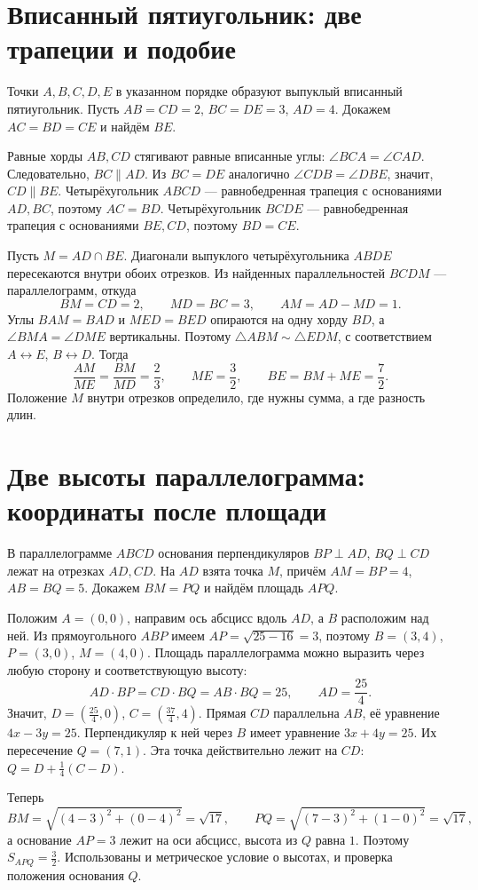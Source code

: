 \section{Вписанный пятиугольник: две трапеции и подобие}
\begin{example}\label{ex:review-ege-targeted-pentagon}
Точки \(A,B,C,D,E\) в указанном порядке образуют выпуклый вписанный пятиугольник. Пусть \(AB=CD=2\), \(BC=DE=3\), \(AD=4\). Докажем \(AC=BD=CE\) и найдём \(BE\).

Равные хорды \(AB,CD\) стягивают равные вписанные углы: \(\angle BCA=\angle CAD\). Следовательно, \(BC\parallel AD\). Из \(BC=DE\) аналогично \(\angle CDB=\angle DBE\), значит, \(CD\parallel BE\). Четырёхугольник \(ABCD\) --- равнобедренная трапеция с основаниями \(AD,BC\), поэтому \(AC=BD\). Четырёхугольник \(BCDE\) --- равнобедренная трапеция с основаниями \(BE,CD\), поэтому \(BD=CE\).

Пусть \(M=AD\cap BE\). Диагонали выпуклого четырёхугольника \(ABDE\) пересекаются внутри обоих отрезков. Из найденных параллельностей \(BCDM\) --- параллелограмм, откуда
\[
BM=CD=2,\qquad MD=BC=3,\qquad AM=AD-MD=1.
\]
Углы \(BAM=BAD\) и \(MED=BED\) опираются на одну хорду \(BD\), а \(\angle BMA=\angle DME\) вертикальны. Поэтому \(\triangle ABM\sim\triangle EDM\), с соответствием \(A\leftrightarrow E\), \(B\leftrightarrow D\). Тогда
\[
\frac{AM}{ME}=\frac{BM}{MD}=\frac23,
\qquad ME=\frac32,
\qquad BE=BM+ME=\frac72.
\]
Положение \(M\) внутри отрезков определило, где нужны сумма, а где разность длин.
\end{example}

\section{Две высоты параллелограмма: координаты после площади}
\begin{example}\label{ex:review-ege-targeted-parallelogram}
В параллелограмме \(ABCD\) основания перпендикуляров \(BP\perp AD\), \(BQ\perp CD\) лежат на отрезках \(AD,CD\). На \(AD\) взята точка \(M\), причём \(AM=BP=4\), \(AB=BQ=5\). Докажем \(BM=PQ\) и найдём площадь \(APQ\).

Положим \(A=(0,0)\), направим ось абсцисс вдоль \(AD\), а \(B\) расположим над ней. Из прямоугольного \(ABP\) имеем \(AP=\sqrt{25-16}=3\), поэтому \(B=(3,4)\), \(P=(3,0)\), \(M=(4,0)\). Площадь параллелограмма можно выразить через любую сторону и соответствующую высоту:
\[
AD\cdot BP=CD\cdot BQ=AB\cdot BQ=25,
\qquad AD=\frac{25}{4}.
\]
Значит, \(D=(\frac{25}{4},0)\), \(C=(\frac{37}{4},4)\). Прямая \(CD\) параллельна \(AB\), её уравнение \(4x-3y=25\). Перпендикуляр к ней через \(B\) имеет уравнение \(3x+4y=25\). Их пересечение \(Q=(7,1)\). Эта точка действительно лежит на \(CD\): \(Q=D+\frac14(C-D)\).

Теперь
\[
BM=\sqrt{(4-3)^2+(0-4)^2}=\sqrt{17},
\qquad PQ=\sqrt{(7-3)^2+(1-0)^2}=\sqrt{17},
\]
а основание \(AP=3\) лежит на оси абсцисс, высота из \(Q\) равна \(1\). Поэтому \(S_{APQ}=\frac32\). Использованы и метрическое условие о высотах, и проверка положения основания \(Q\).
\end{example}

